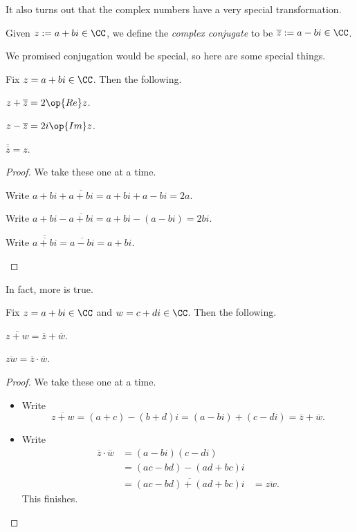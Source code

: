 It also turns out that the complex numbers have a very special transformation.
\begin{definition}[Conjugate]
	Given $z:=a+bi\in\CC$, we define the \textit{complex conjugate} to be $\overline z:=a-bi\in\CC$.
\end{definition}
We promised conjugation would be special, so here are some special things.
\begin{proposition}
	Fix $z=a+bi\in\CC$. Then the following.
	\begin{listalph}
		\item $z+\overline z=2\op{Re}z$.
		\item $z-\overline z=2i\op{Im}z$.
		\item $\overline{\overline z}=z$.
	\end{listalph}
\end{proposition}
\begin{proof}
	We take these one at a time.
	\begin{listalph}
		\item Write $a+bi+\overline{a+bi}=a+bi+a-bi=2a$.
		\item Write $a+bi-\overline{a+bi}=a+bi-(a-bi)=2bi$.
		\item Write $\overline{\overline{a+bi}}=\overline{a-bi}=a+bi$.
		\qedhere
	\end{listalph}
\end{proof}
In fact, more is true.
\begin{proposition}
	Fix $z=a+bi\in\CC$ and $w=c+di\in\CC$. Then the following.
	\begin{listalph}
		\item $\overline{z+w}=\overline z+\overline w$.
		\item $\overline{zw}=\overline z\cdot\overline w$.
	\end{listalph}
\end{proposition}
\begin{proof}
	We take these one at a time.
	\begin{itemize}
		\item Write
		\[\overline{z+w}=(a+c)-(b+d)i=(a-bi)+(c-di)=\overline z+\overline w.\]
		\item Write
		\begin{align*}
			\overline z\cdot\overline w &= (a-bi)(c-di) \\
			&= (ac-bd)-(ad+bc)i \\
			&= \overline{(ac-bd)+(ad+bc)i}
			&= \overline{zw}.
		\end{align*}
		This finishes.
		\qedhere
	\end{itemize}
\end{proof}

